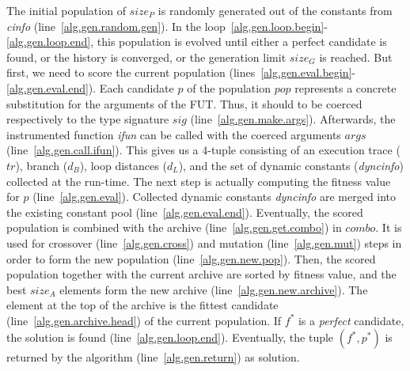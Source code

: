 \documentclass[sigconf,review]{acmart}
\begin{document}
The initial population of $size_P$ is randomly generated out of the constants from \emph{cinfo} (line~\ref{alg.gen.random.gen}). In the loop~\ref{alg.gen.loop.begin}-\ref{alg.gen.loop.end}, this population is evolved until either a perfect candidate is found, or the history is converged, or the generation limit $size_G$ is reached. But first, we need to score the current population (lines~\ref{alg.gen.eval.begin}-\ref{alg.gen.eval.end}). Each candidate $p$ of the population $pop$ represents a concrete substitution for the arguments of the FUT. Thus, it should to be coerced respectively to the type signature $sig$ (line~\ref{alg.gen.make.args}). Afterwards, the instrumented function \emph{ifun} can be called with the coerced arguments $args$ (line~\ref{alg.gen.call.ifun}). This gives us a 4-tuple consisting of an execution trace ($tr$), branch ($d_B$), loop distances ($d_L$), and the set of dynamic constants (\emph{dyncinfo}) collected at the run-time. The next step is actually computing the fitness value for $p$ (line~\ref{alg.gen.eval}). Collected dynamic constants \emph{dyncinfo} are merged into the existing constant pool (line~\ref{alg.gen.eval.end}). Eventually, the scored population is combined with the archive (line~\ref{alg.gen.get.combo}) in $combo$. It is used for crossover (line~\ref{alg.gen.cross}) and mutation (line~\ref{alg.gen.mut}) steps in order to form the new population (line~\ref{alg.gen.new.pop}). Then, the scored population together with the current archive are sorted by fitness value, and the best $size_A$ elements form the new archive (line~\ref{alg.gen.new.archive}). The element at the top of the archive is the fittest candidate (line~\ref{alg.gen.archive.head}) of the current population. If $f^*$ is a \emph{perfect} candidate, the solution is found (line~\ref{alg.gen.loop.end}). Eventually, the tuple $(f^*, p^*)$ is returned by the algorithm (line~\ref{alg.gen.return}) as solution.
\end{document}
